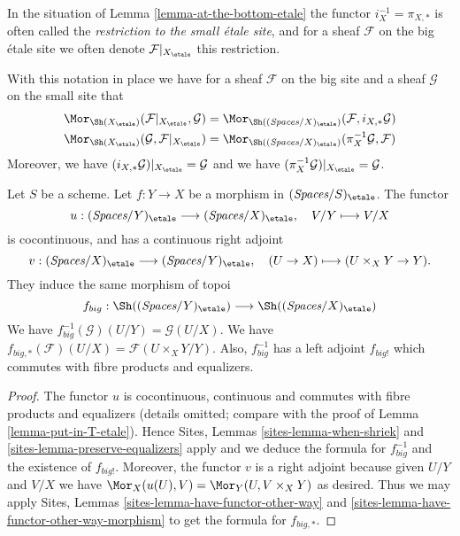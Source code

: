 \begin{definition}
\label{definition-restriction-small-etale}
In the situation of Lemma \ref{lemma-at-the-bottom-etale}
the functor $i_X^{-1} = \pi_{X, *}$ is often
called the {\it restriction to the small \'etale site}, and for a sheaf
$\mathcal{F}$ on the big \'etale site we often denote
$\mathcal{F}|_{X_\etale}$ this restriction.
\end{definition}

\noindent
With this notation in place we have for a sheaf $\mathcal{F}$ on the
big site and a sheaf $\mathcal{G}$ on the small site that
\begin{align*}
\Mor_{\Sh(X_\etale)}(
\mathcal{F}|_{X_\etale},
\mathcal{G})
& =
\Mor_{\Sh((\textit{Spaces}/X)_\etale)}(
\mathcal{F},
i_{X, *}\mathcal{G}) \\
\Mor_{\Sh(X_\etale)}(
\mathcal{G},
\mathcal{F}|_{X_\etale})
& =
\Mor_{\Sh((\textit{Spaces}/X)_\etale)}(
\pi_X^{-1}\mathcal{G},
\mathcal{F})
\end{align*}
Moreover, we have $(i_{X, *}\mathcal{G})|_{X_\etale} = \mathcal{G}$
and we have $(\pi_X^{-1}\mathcal{G})|_{X_\etale} = \mathcal{G}$.

\begin{lemma}
\label{lemma-morphism-big-etale}
Let $S$ be a scheme. Let $f : Y \to X$ be a morphism in
$(\textit{Spaces}/S)_\etale$. The functor
$$
u :
(\textit{Spaces}/Y)_\etale
\longrightarrow
(\textit{Spaces}/X)_\etale,
\quad
V/Y \longmapsto V/X
$$
is cocontinuous, and has a continuous right adjoint
$$
v :
(\textit{Spaces}/X)_\etale
\longrightarrow
(\textit{Spaces}/Y)_\etale,
\quad
(U \to X) \longmapsto (U \times_X Y \to Y).
$$
They induce the same morphism of topoi
$$
f_{big} :
\Sh((\textit{Spaces}/Y)_\etale)
\longrightarrow
\Sh((\textit{Spaces}/X)_\etale)
$$
We have $f_{big}^{-1}(\mathcal{G})(U/Y) = \mathcal{G}(U/X)$.
We have $f_{big, *}(\mathcal{F})(U/X) = \mathcal{F}(U \times_X Y/Y)$.
Also, $f_{big}^{-1}$ has a left adjoint $f_{big!}$ which commutes with
fibre products and equalizers.
\end{lemma}

\begin{proof}
The functor $u$ is cocontinuous, continuous and commutes with fibre products
and equalizers (details omitted; compare with the proof of
Lemma \ref{lemma-put-in-T-etale}).
Hence
Sites, Lemmas \ref{sites-lemma-when-shriek} and
\ref{sites-lemma-preserve-equalizers}
apply and we deduce the formula
for $f_{big}^{-1}$ and the existence of $f_{big!}$. Moreover,
the functor $v$ is a right adjoint because given $U/Y$ and $V/X$
we have $\Mor_X(u(U), V) = \Mor_Y(U, V \times_X Y)$
as desired. Thus we may apply
Sites, Lemmas \ref{sites-lemma-have-functor-other-way} and
\ref{sites-lemma-have-functor-other-way-morphism} to get the
formula for $f_{big, *}$.
\end{proof}

